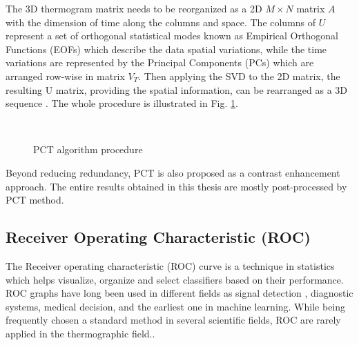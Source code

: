 The 3D thermogram matrix needs to be reorganized as a 2D $M\times N$ matrix $A$ with the dimension of time along the columns and space. The columns of $U$ represent a set of orthogonal statistical modes known as Empirical Orthogonal Functions (EOFs) which describe the data spatial variations, while the time variations are represented by the Principal Components (PCs) which are arranged row-wise in matrix $V_T$. Then applying the SVD to the 2D matrix, the resulting U matrix, providing the spatial information, can be rearranged as a 3D sequence \citep{Ibarra-Castanedo2006}. The whole procedure is illustrated in Fig. \ref{PCT_SVD}.
\begin{figure}[htbp]
	\centering
	\\
	\caption{PCT algorithm procedure}
	\label{PCT_SVD}
\end{figure}

Beyond reducing redundancy, PCT is also proposed as a contrast enhancement approach.
The entire results obtained in this thesis are mostly post-processed by PCT method.

\subsection{Receiver Operating 	Characteristic (ROC)}
The Receiver operating characteristic (ROC) curve is a technique in statistics which helps visualize, organize and select classifiers based on their performance. ROC graphs have long been used in different fields as signal detection \citep{swets2000better}, diagnostic systems\citep{swets1988measuring}, medical decision\citep{zou2002receiver}, and the earliest one in machine learning\citep{spackman1989signal}. While being frequently chosen a standard method in several scientific fields, ROC are rarely applied in the thermographic field.\citep{Bison2014a}.

